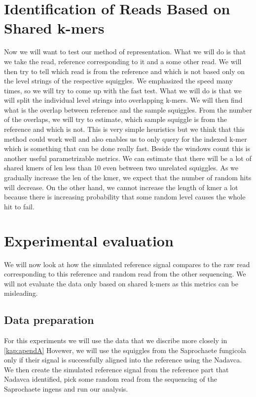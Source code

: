 \section{Identification of Reads Based on Shared k-mers}

Now we will want to test our method of representation. What we will do is that we
take the read, reference corresponding to it and a some other read. We will then
try to tell which read is from the reference and which is not based only on the
level strings of the respective squiggles. We emphasized the speed many times, so
we will try to come up with the fast test. What we will do is that we will split the
individual level strings into overlapping k-mers. We will then find what is the overlap
between reference and the sample squiggles. From the number of the overlaps, we will try
to estimate, which sample squiggle is from the reference and which is not. This is very
simple heuristics but we think that this method could work well and also enables us
to only query for the indexed k-mer which is something that can be done really fast.
Beside the windows count this is another useful parametrizable metrics. We can estimate
that there will be a lot of shared kmers of len less than 10 even between two unrelated
squiggles. As we gradually increase the len of the kmer, we expect that the number
of random hits will decrease. On the other hand, we cannot increase the length of kmer
a lot because there is increasing probability that some random level causes the
whole hit to fail.

\section{Experimental evaluation}

We will now look at how the simulated reference signal compares to the raw read
corresponding to this reference and random read from the other sequencing. We will
not evaluate the data only based on shared k-mers as this metrics can be misleading.

\subsection{Data preparation}

For this experiments we will use the data that we discribe more closely in \ref{kap:apendA}
Hovewer, we will use the squiggles from the Saprochaete fungicola only if their signal
is successfully aligned into the reference using the Nadavca. We then create the
simulated reference signal from the reference part that Nadavca identified, pick
some random read from the sequencing of the Saprochaete ingens and run our analysis.


